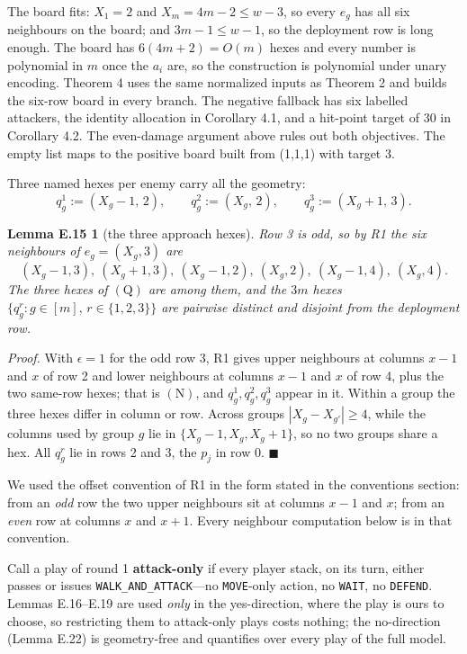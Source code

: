 \documentclass[11pt,a4paper]{article}
\theoremstyle{plain}
\newtheorem*{lemEseatsfour}{Lemma E.15}
\theoremstyle{definition}
\theoremstyle{plain}
\theoremstyle{definition}
\theoremstyle{remark}
\newcommand{\qedbox}{\hfill$\blacksquare$}
\begin{document}
\noindent The board fits: $X_1=2$ and $X_m=4m-2\le w-3$, so every $e_g$ has all six
neighbours on the board; and $3m-1\le w-1$, so the deployment row is long enough. The board
has $6(4m+2)=O(m)$ hexes and every number is polynomial in $m$ once the $a_i$ are, so the
construction is polynomial under unary encoding. Theorem 4 uses the same normalized inputs as Theorem 2 and builds the six-row board in every branch. The negative fallback has six labelled attackers, the identity allocation in Corollary 4.1, and a hit-point target of 30 in Corollary 4.2. The even-damage argument above rules out both objectives. The empty list maps to the positive board built from (1,1,1) with target 3.

Three named hexes per enemy carry all the geometry:
\begin{equation*}
  q_g^1:=(X_g-1,\,2),\qquad q_g^2:=(X_g,\,2),\qquad q_g^3:=(X_g+1,\,3).
  \tag{Q}
\end{equation*}

\begin{lemEseatsfour}[the three approach hexes]
Row 3 is odd, so by R1 the six neighbours of $e_g=(X_g,3)$ are
\begin{equation*}
  (X_g-1,3),\ (X_g+1,3),\ (X_g-1,2),\ (X_g,2),\ (X_g-1,4),\ (X_g,4).
  \tag{N}
\end{equation*}
The three hexes of $(\mathrm{Q})$ are among them, and the $3m$ hexes
$\{q_g^r: g\in[m],\,r\in\{1,2,3\}\}$ are pairwise distinct and disjoint from the deployment
row.
\end{lemEseatsfour}

\noindent\emph{Proof.} With $\epsilon=1$ for the odd row 3, R1 gives upper neighbours at
columns $x-1$ and $x$ of row 2 and lower neighbours at columns $x-1$ and $x$ of row 4, plus
the two same-row hexes; that is $(\mathrm{N})$, and $q_g^1,q_g^2,q_g^3$ appear in it. Within a
group the three hexes differ in column or row. Across groups $|X_g-X_{g'}|\ge 4$, while the
columns used by group $g$ lie in $\{X_g-1,X_g,X_g+1\}$, so no two groups share a hex. All
$q_g^r$ lie in rows 2 and 3, the $p_j$ in row 0. \qedbox

\smallskip
We used the offset convention of R1 in the form stated in the conventions section: from an
\emph{odd} row the two upper neighbours sit at columns $x-1$ and $x$; from an \emph{even} row
at columns $x$ and $x+1$. Every neighbour computation below is in that convention.

\smallskip
Call a play of round 1 \textbf{attack-only} if every player stack, on its turn, either passes
or issues \texttt{WALK\_AND\_ATTACK}---no \texttt{MOVE}-only action, no \texttt{WAIT}, no
\texttt{DEFEND}. Lemmas E.16--E.19 are used \emph{only} in the yes-direction, where the play
is ours to choose, so restricting them to attack-only plays costs nothing; the no-direction
(Lemma E.22) is geometry-free and quantifies over every play of the full model.
\end{document}
